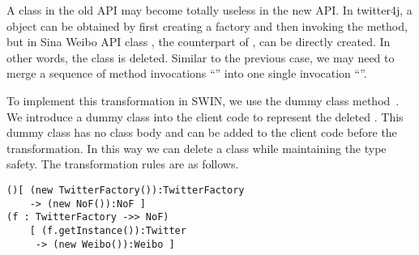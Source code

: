  A class in the old API may become totally
useless in the new API. In twitter4j, a  object can be
obtained by first creating a factory  and then
invoking the  method, but in Sina Weibo API class
, the counterpart of , can be directly
created. In other words, the class  is
deleted. Similar to the previous case, we may need to merge a sequence
of method invocations ``''
into one single invocation ``''.

To implement this transformation in SWIN, we use the dummy class
method~\cite{twinning}. We introduce a dummy class  into the
client code to represent the deleted . This
dummy class has no class body and can be added to the client code
before the transformation. In this way we can delete a class while
maintaining the type safety. The transformation rules are as follows.
\begin{lstlisting}
()[ (new TwitterFactory()):TwitterFactory 
    -> (new NoF()):NoF ]
(f : TwitterFactory ->> NoF) 
    [ (f.getInstance()):Twitter
     -> (new Weibo()):Weibo ]
\end{lstlisting}



